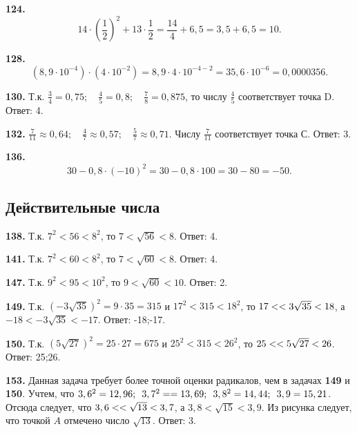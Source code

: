 \textbf{124.} $$14\cdot\left(\frac{1}{2}\right)^2+13\cdot\frac{1}{2}=\frac{14}{4}+6,5=3,5+6,5=10.$$

\textbf{128.}  $$\left(8,9\cdot10^{-4}\right)\cdot\left(4\cdot10^{-2}\right)=8,9\cdot4\cdot10^{-4-2}=35,6\cdot10^{-6}=0,0000356.$$

\textbf{130.} Т.к. $\frac{3}{4}=0,75;\quad\frac{4}{5}=0,8;\quad\frac{7}{8}=0,875$, то числу $\frac{4}{5}$ соответствует  точка D. \newline \null \hspace*{\fill} Ответ: 4. 

\textbf{132.}  $\frac{7}{11}\approx0,64;\quad\frac{4}{7}\approx0,57;\quad\frac{5}{7}\approx0,71$. Числу $\frac{7}{11}$ соответствует точка  С. \newline \null \hspace*{\fill} Ответ: 3. 

\textbf{136.} $$30-0,8\cdot\left(-10\right)^2=30-0,8\cdot100=30-80=-50.$$

\subsection{ Действительные числа}


\textbf{138.} Т.к. $7^2<56<8^2$, то $7<\sqrt{56}<8$.  Ответ: 4. 

\textbf{141.} Т.к. $7^2<60<8^2$, то $7<\sqrt{60}<8$. \newline \null \hspace*{\fill} Ответ: 4. 

\textbf{147.} Т.к. $9^2<95<10^2$, то $9<\sqrt{60}<10$. \newline \null \hspace*{\fill} Ответ: 2. 

\textbf{149.} Т.к. $\left(-3\sqrt{35}\right)^2=9\cdot35=315$ и $17^2<315<18^2$, то $17<\linebreak<3\sqrt{35}<18$, а $-18<-3\sqrt{35}<-17$. \newline \null \hspace*{\fill} Ответ: -18;-17.
 
\textbf{150.} Т.к. $\left(5\sqrt{27}\right)^2=25\cdot27=675$ и $25^2<315<26^2$, то $25<\linebreak<5\sqrt{27}<26$. \newline \null \hspace*{\fill} Ответ: 25;26.

\textbf{153.}  Данная задача требует более точной оценки радикалов, чем в задачах \textbf{149} и \textbf{150}.  Учтем, что $3,6^2=12,96;\enspace 3,7^2=\linebreak=13,69;\enspace 3,8^2=14,44;\enspace 3,9=15,21$. Отсюда следует, что $3,6<\linebreak<\sqrt{13}<3,7$, а $3,8<\sqrt{15}<3,9$. Из рисунка  следует, что точкой $A$ отмечено число $\sqrt{13}$. \newline \null \hspace*{\fill} Ответ: 3. 

